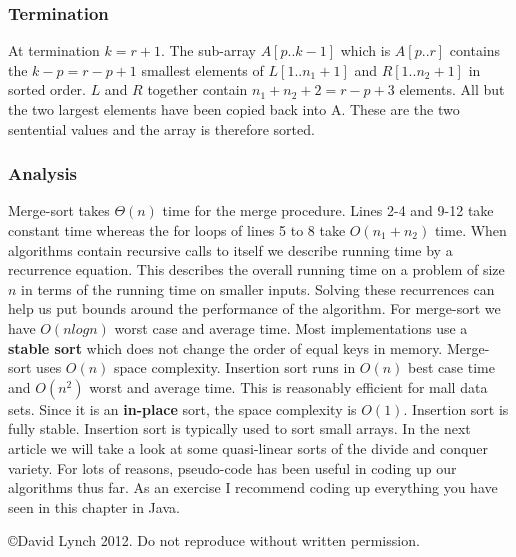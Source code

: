 \documentclass[10pt,a4paper]{article}
\begin{document}
\subsubsection{Termination}
At termination $k=r+1$. The sub-array $A[p..k-1]$ which is $A[p..r]$ contains the $k-p=r-p+1$ smallest elements of $L[1..n_1+1]$ and $R[1..n_2+1]$ in sorted order. $L$ and $R$ together contain $n_1+n_2+2=r-p+3$ elements. All but the two largest elements have been copied back into A. These are the two sentential values and the array is therefore sorted.
\subsubsection{Analysis}
Merge-sort takes $\Theta(n)$ time for the merge procedure. Lines 2-4 and 9-12 take constant time whereas the for loops of lines 5 to 8 take $O(n_1+n_2)$ time. When algorithms contain recursive calls to itself we describe running time by a recurrence equation. This describes the overall running time on a problem of size $n$ in terms of the running time on smaller inputs. Solving these recurrences can help us put bounds around the performance of the algorithm. For merge-sort we have $O(n log n)$ worst case and average time. Most implementations use a {\bf stable sort} which does not change the order of equal keys in memory. Merge-sort uses $O(n)$ space complexity. 
\newline\newline
Insertion sort runs in $O(n)$ best case time and $O(n^2)$ worst and average time. This is reasonably efficient for mall data sets. Since it is an {\bf in-place} sort, the space complexity is $O(1)$. Insertion sort is fully stable. Insertion sort is typically used to sort small arrays. 
\newline\newline
In the next article we will take a look at some quasi-linear sorts of the divide and conquer variety. For lots of reasons, pseudo-code has been useful in coding up our algorithms thus far. As an exercise I recommend coding up everything you have seen in this chapter in Java.
{}

\begin{center}
{\small \copyright  David Lynch 2012. Do not reproduce without written permission.}
\end{center}
\end{document}
